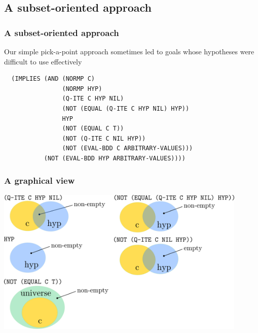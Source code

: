 
\subsection{A subset-oriented approach}

\begin{frame}[fragile]
\frametitle{A subset-oriented approach}

Our simple pick-a-point approach sometimes led to goals whose hypotheses were
difficult to use effectively

\begin{verbatim}
  (IMPLIES (AND (NORMP C)
                (NORMP HYP)
                (Q-ITE C HYP NIL)
                (NOT (EQUAL (Q-ITE C HYP NIL) HYP))
                HYP
                (NOT (EQUAL C T))
                (NOT (Q-ITE C NIL HYP))
                (NOT (EVAL-BDD C ARBITRARY-VALUES)))
           (NOT (EVAL-BDD HYP ARBITRARY-VALUES))))
\end{verbatim}
\end{frame}


\begin{frame}[fragile]
\frametitle{A graphical view}

\includegraphics[width=12cm]{venn-diagrams}

\end{frame}



